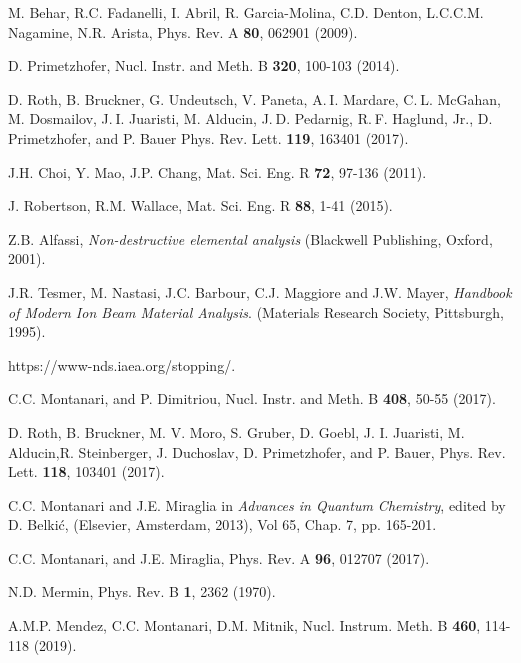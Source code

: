 \documentclass[aps,pra,reprint,superscriptaddress]{revtex4-1}
\begin{document}
\begin{thebibliography}{00}
M. Behar, R.C. Fadanelli, I. Abril, R. Garcia-Molina, C.D. Denton, 
L.C.C.M. Nagamine, N.R. Arista, 
Phys. Rev. A \textbf{80},  062901 (2009).

D. Primetzhofer, 
Nucl. Instr. and Meth. B \textbf{320}, 100-103 (2014).

D. Roth, B. Bruckner, G. Undeutsch, V. Paneta, A. I. Mardare, 
C. L. McGahan, M. Dosmailov, J. I. Juaristi, M. Alducin, 
J. D. Pedarnig, R. F. Haglund, Jr., D. Primetzhofer, and P. Bauer
Phys. Rev. Lett. \textbf{119}, 163401 (2017).

J.H. Choi, Y. Mao, J.P. Chang, 
Mat. Sci. Eng. R \textbf{72}, 97-136 (2011).

J. Robertson, R.M. Wallace, 
Mat. Sci. Eng. R \textbf{88}, 1-41 (2015).

Z.B. Alfassi,
\textit{Non-destructive elemental analysis}
(Blackwell Publishing, Oxford, 2001).

J.R. Tesmer, M. Nastasi, J.C. Barbour, C.J. Maggiore and J.W. Mayer,
\textit{Handbook of Modern Ion Beam Material Analysis}.
(Materials Research Society, Pittsburgh, 1995).

https://www-nds.iaea.org/stopping/.

C.C. Montanari, and P. Dimitriou, 
Nucl. Instr. and Meth. B \textbf{408},  50-55 (2017).

 D. Roth, B. Bruckner, M. V. Moro, S. Gruber, D. Goebl, J. I. Juaristi, M. Alducin,R. Steinberger, J. Duchoslav, D. Primetzhofer, and P. Bauer, Phys. Rev. Lett. \textbf{118}, 103401 (2017).

C.C. Montanari and J.E. Miraglia in 
\textit{Advances in Quantum Chemistry}, 
edited by D. Belki\'c, (Elsevier, Amsterdam, 2013), Vol 65, Chap. 7, pp. 165-201. 

C.C. Montanari, and J.E. Miraglia, 
Phys. Rev. A \textbf{96}, 012707 (2017).

N.D. Mermin, 
Phys. Rev. B \textbf{1}, 2362 (1970).

A.M.P. Mendez, C.C. Montanari, D.M. Mitnik, 
Nucl. Instrum. Meth. B \textbf{460}, 114-118 (2019).


\end{thebibliography}
\end{document}
